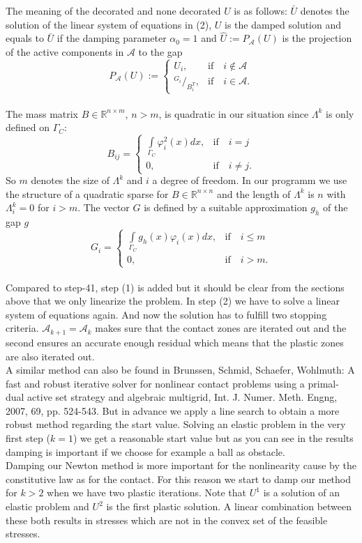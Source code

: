 \documentclass{article}
\begin{document}
\noindent
The meaning of the decorated and none decorated $U$ is as follows: $\bar U$
denotes the solution of the linear system of equations in (2), $U$ is the
damped solution and equals to $\bar U$ if the damping parameter $\alpha_0 =
1$ and $\hat U := P_{\mathcal{A}}(U)$ is the projection of the active
components in $\mathcal{A}$ to the gap
$$P_{\mathcal{A}}(U):=\begin{cases}
U_i, & \textrm{if}\quad i\notin\mathcal{A}\\
{}^{G_i}/_{B^T_i}, & \textrm{if}\quad
i\in\mathcal{A}.
\end{cases}$$\\
The mass matrix $B\in\mathbb{R}^{n\times m}$, $n>m$, is quadratic in our situation since $\Lambda^k$ is only defined on $\Gamma_C$:
$$B_{ij} = \begin{cases}
\int\limits_{\Gamma_C}\varphi_i^2(x)dx, & \text{if}\quad i=j\\
0, & \text{if}\quad i\neq j.
\end{cases}$$
So $m$ denotes the size of $\Lambda^k$ and $i$ a degree of freedom. In our
programm we use the structure of a quadratic sparse for $B\in\mathbb{R}^{n\times
n}$ and the length of $\Lambda^k$ is $n$ with $\Lambda^k_i = 0$ for $i>m$.
The vector $G$ is defined by a suitable approximation $g_h$ of the gap $g$
$$G_i = \begin{cases}
\int\limits_{\Gamma_C}g_h(x)\varphi_i(x)dx, & \text{if}\quad i\leq m\\
0, & \text{if}\quad i>m.
\end{cases}$$\\
Compared to step-41, step (1) is added but it should be clear
from the sections above that we only linearize the problem. In step (2) we have
to solve a linear system of equations again. And now the solution has to fulfill two stopping
criteria. $\mathcal{A}_{k+1} = \mathcal{A}_k$ makes sure that the contact zones
are iterated out and the second ensures an accurate enough residual which means that the plastic zones are also iterated out.\\
A similar method can also be found in Brunssen, Schmid, Schaefer, Wohlmuth: A
fast and robust iterative solver for nonlinear contact problems using a 
primal-dual active set strategy and algebraic multigrid, Int. J. Numer.
Meth. Engng, 2007, 69, pp. 524-543. But in advance we apply a line search to
obtain a more robust method regarding the start value. Solving an elastic
problem in the very first step ($k=1$) we get a reasonable start value but as
you can see in the results damping is important if we choose for example a ball as
obstacle.\\
Damping our Newton method is more important for the nonlinearity cause by the
constitutive law as for the contact. For this reason we start to damp our method
for $k>2$ when we have two plastic iterations. Note that $U^1$ is a solution of
an elastic problem and $U^2$ is the first plastic solution. A linear combination
between these both results in stresses which are not in the convex set
of the feasible stresses.
\end{document}
